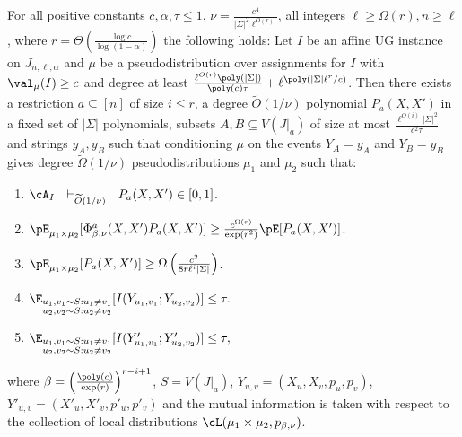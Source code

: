 \begin{lemma}\label{lem:sp-j-low-comp}
For all positive constants $c, \alpha, \tau \leq 1$, $\nu = \frac{c^4}{|\Sigma|^2\ell^{O(r)}}$, all integers $\ell \geq \Omega(r), n \geq \ell$, where $r = \Theta(\frac{\log c}{\log(1-\alpha)})$ the following holds: Let $I$ be an affine UG instance on $J_{n,\ell,\alpha}$ and $\mu$ be a pseudodistribution over assignments for $I$ with $\val_\mu(I) \geq c$ and degree at least $ \frac{\ell^{O(r)}\poly(|\Sigma|)}{\poly(c)\tau}+ \ell^{\poly(|\Sigma|\ell^r/c)}$. Then there exists a restriction $a \subseteq [n]$ of size $i \leq r$, a degree $\widetilde{O}(1/\nu)$ polynomial $P_a(X,X')$ in a fixed set of $|\Sigma|$ polynomials, subsets $A, B \subseteq V(J|_a)$ of size at most $\frac{\ell^{O(i)}|\Sigma|^2}{c^2\tau}$ and strings $y_A, y_B$ such that conditioning $\mu$ on the events $Y_A = y_A$ and $Y_B = y_B$ gives degree $\widetilde{\Omega}(1/\nu)$ pseudodistributions $\mu_1$ and $\mu_2$ such that:
\begin{enumerate}
\item $\cA_I  ~~\vdash_{\widetilde{O}(1/\nu)} ~~ P_a(X,X') \in [0,1]$.
\item $\pE_{\mu_1 \times \mu_2}[\Phi^a_{\beta,\nu}(X,X')P_a(X,X')] \geq \frac{c^{\Omega(r)}}{\exp(r^2)} \pE[P_a(X,X')]$.
\item $\pE_{\mu_1 \times \mu_2}[P_a(X,X')] \geq \Omega\left(\frac{c^2}{8r\ell^i|\Sigma|}\right)$.
\item $\E_{\substack{u_1,v_1 \sim S: u_1 \neq v_1\\ u_2,v_2 \sim S: u_2 \neq v_2}}[I(Y_{u_1,v_1};Y_{u_2,v_2})] \leq \tau.$
\item $\E_{\substack{u_1,v_1 \sim S: u_1 \neq v_1\\ u_2,v_2 \sim S: u_2 \neq v_2}}[I(Y'_{u_1,v_1};Y'_{u_2,v_2})] \leq \tau,$
\end{enumerate}
where $\beta = \left(\frac{\poly(c)}{\exp(r)}\right)^{r-i+1}$, $S = V(J|_a)$, $Y_{u,v} = (X_u,X_v,p_u,p_v)$, $Y'_{u,v} = (X'_u,X'_v,p'_u,p'_v)$ and the mutual information is taken with respect to the collection of local distributions $\cL(\mu_1 \times \mu_2,p_{\beta,\nu})$. 
\end{lemma}

